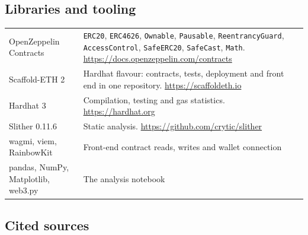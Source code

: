 \documentclass[11pt,a4paper]{article}
\begin{document}
\subsection*{Libraries and tooling}

\begin{center}
\small
\begin{tabular}{@{}p{3.6cm}p{11.4cm}@{}}
\toprule
OpenZeppelin Contracts & \texttt{ERC20}, \texttt{ERC4626}, \texttt{Ownable}, \texttt{Pausable}, \texttt{ReentrancyGuard}, \texttt{AccessControl}, \texttt{SafeERC20}, \texttt{SafeCast}, \texttt{Math}. \url{https://docs.openzeppelin.com/contracts} \\
Scaffold-ETH 2 & Hardhat flavour: contracts, tests, deployment and front end in one repository. \url{https://scaffoldeth.io} \\
Hardhat 3 & Compilation, testing and gas statistics. \url{https://hardhat.org} \\
Slither 0.11.6 & Static analysis. \url{https://github.com/crytic/slither} \\
wagmi, viem, RainbowKit & Front-end contract reads, writes and wallet connection \\
pandas, NumPy, Matplotlib, web3.py & The analysis notebook \\
\bottomrule
\end{tabular}
\end{center}

\subsection*{Cited sources}
\end{document}
